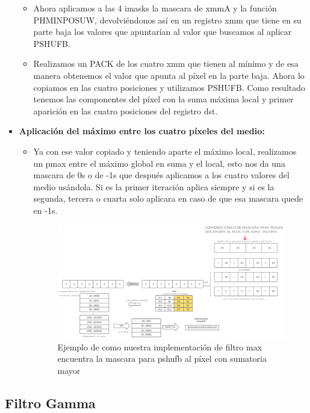 \documentclass[a4paper]{article}
\begin{document}
\begin{itemize}
\begin{itemize}
    \item Ahora aplicamos a las 4 imasks la mascara de xmmA y la función PHMINPOSUW, devolviéndonos así en un registro xmm que tiene en su parte baja los valores que apuntarían al valor que buscamos al aplicar PSHUFB.\\
    \item Realizamos un PACK de los cuatro xmm que tienen al mínimo y de esa manera obtenemos el valor que apunta al píxel en la parte baja. Ahora lo copiamos en las cuatro posiciones y utilizamos PSHUFB. Como resultado tenemos las componentes del píxel con la suma máxima local y primer aparición en las cuatro posiciones del registro dst.\\
    \end{itemize}
    \item \textbf{Aplicación del máximo entre los cuatro píxeles del medio:}
    \begin{itemize}
    \item Ya con ese valor copiado y teniendo aparte el máximo local, realizamos un pmax entre el máximo global en suma y el local, esto nos da una mascara de 0s o de -1s que después aplicamos a los cuatro valores del medio usándola. Si es la primer iteración aplica siempre y si es la segunda, tercera o cuarta solo aplicara en caso de que esa mascara quede en -1s. 
    \begin{figure}[htp]
    \centering
    \includegraphics[scale=.26]{algofig.jpg}
    \caption{Ejemplo de como nuestra implementación de filtro max encuentra la mascara para pshufb al píxel con sumatoria mayor}
    \label{}
    \end{figure}
    \end{itemize}
    
\end{itemize}
  

\newpage


\subsection{Filtro Gamma}
\end{document}
